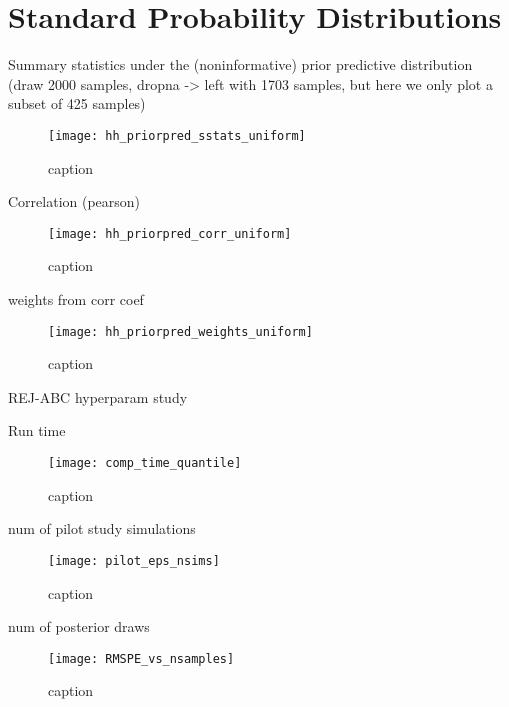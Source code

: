 \chapter{Standard Probability Distributions}\label{sec:Appendix A}


Summary statistics under the (noninformative) prior predictive distribution (draw 2000 samples, dropna -> left with 1703 samples, but here we only plot a subset of 425 samples)

\begin{figure}[H]
    \centering
    \texttt{[image: hh\_priorpred\_sstats\_uniform]}
    \caption{caption}
    \label{fig:fig1}
\end{figure} 


Correlation (pearson) 

\begin{figure}[H]
    \centering
    \texttt{[image: hh\_priorpred\_corr\_uniform]}
    \caption{caption}
    \label{fig:fig1}
\end{figure} 

weights from corr coef

\begin{figure}[H]
    \centering
    \texttt{[image: hh\_priorpred\_weights\_uniform]}
    \caption{caption}
    \label{fig:fig1}
\end{figure} 

 
REJ-ABC hyperparam study 

Run time

\begin{figure}[H]
    \centering
    \texttt{[image: comp\_time\_quantile]}
    \caption{caption}
    \label{fig:fig1}
\end{figure}

num of pilot study simulations 

\begin{figure}[H]
    \centering
    \texttt{[image: pilot\_eps\_nsims]}
    \caption{caption}
    \label{fig:fig1}
\end{figure} 

num of posterior draws

\begin{figure}[H]
    \centering
    \texttt{[image: RMSPE\_vs\_nsamples]}
    \caption{caption}
    \label{fig:fig1}
\end{figure} 


